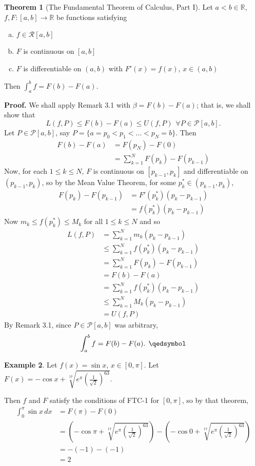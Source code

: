 \documentclass[11pt]{article}
\theoremstyle{definition}
\newtheorem{thm}{Theorem}[section]
\newtheorem{exmp}[thm]{Example}
\newcommand{\mbR}{\ensuremath{\mathbb{R}}}
\begin{document}
\begin{thm}[The Fundamental Theorem of Calculus, Part I]
Let $a < b \in \mbR$, $f, F : [a, b] \to \mbR$ be functions satisfying
\begin{enumerate}[(a)] \vspace{-0.2cm}
\item $f \in \mathcal{R}[a, b]$
\item $F$ is continuous on $[a, b]$
\item $F$ is differentiable on $(a, b)$ with $F'(x) = f(x)$, $x \in (a, b)$
\end{enumerate}
Then $\int_a^b f = F(b) - F(a)$.
\end{thm}
\textbf{Proof.} We shall apply Remark 3.1 with $\beta = F(b) - F(a)$; that is, we shall show that
$$L(f, P) \leq F(b) - F(a) \leq U(f, P) \hspace{5pt} \forall P \in \mathcal{P}[a, b] \text{.}$$
Let $P \in \mathcal{P}[a, b]$, say $P = \{a = p_0 < p_1 < \dots < p_N = b\}$. Then
\begin{align*}
F(b) - F(a) & = F(p_N) - F(0) \\
& = \sum_{k=1}^N F(p_k) - F(p_{k-1})
\end{align*}
Now, for each $1 \leq k \leq N$, $F$ is continuous on $[p_{k-1}, p_k]$ and differentiable on $(p_{k-1}, p_k)$, so by the Mean Value Theorem, for some $p_k^* \in (p_{k-1}, p_k)$,
\begin{align*}
F(p_k) - F(p_{k-1}) & = F'(p_k^*)(p_k - p_{k-1}) \\
& = f(p_k^*)(p_k - p_{k-1})
\end{align*}
Now $m_k \leq f(p_k^*) \leq M_k$ for all $1 \leq k \leq N$ and so
\begin{align*}
L(f, P) & = \sum_{k=1}^N m_k (p_k - p_{k-1}) \\
& \leq \sum_{k=1}^N f(p_k^*) (p_k - p_{k-1}) \\
& = \sum_{k=1}^N F(p_k) - F(p_{k-1}) \\
& = F(b) - F(a) \\
& = \sum_{k=1}^N f(p_k^*) (p_k - p_{k-1}) \\
& \leq \sum_{k=1}^N M_k (p_k - p_{k-1}) \\
& = U(f, P)
\end{align*}
By Remark 3.1, since $P \in \mathcal{P}[a, b]$ was arbitrary,
$$\int_a^b f = F(b) - F(a) \text{. } \qedsymbol$$

\begin{exmp}
Let $f(x) = \sin x$, $x \in [0, \pi]$. Let $F(x) = -\cos x + \sqrt[17]{e^\pi \left(\frac{1}{\sqrt{2}}\right)^{63}}$. 

Then $f$ and $F$ satisfy the conditions of FTC-1 for $[0, \pi]$, so by that theorem,
\begin{align*}
\int_0^\pi \sin x\,dx & = F(\pi) - F(0) \\
& = \left(-\cos \pi + \sqrt[17]{e^\pi \left(\frac{1}{\sqrt{2}}\right)^{63}}\right) - \left(-\cos 0 + \sqrt[17]{e^\pi \left(\frac{1}{\sqrt{2}}\right)^{63}}\right) \\
& = -(-1) -(-1) \\
& = 2
\end{align*}
\end{exmp}
\end{document}
